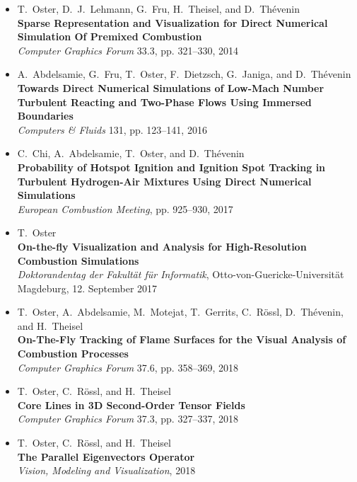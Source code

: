\documentclass[oneside]{scrartcl}
\begin{document}
\begin{itemize}[label={},leftmargin=0pt]
    \item T.~Oster, D.~J.~Lehmann, G.~Fru, H.~Theisel, and D.~Th\'evenin\\
        \textbf{Sparse Representation and Visualization for Direct Numerical
        Simulation Of Premixed Combustion}\\
        {\emph{Computer Graphics Forum} 33.3, pp. 321--330, 2014}

    \item A.~Abdelsamie, G.~Fru, T.~Oster, F.~Dietzsch, G.~Janiga,
        and D.~Thévenin\\
        \textbf{Towards Direct Numerical Simulations of Low-Mach Number
        Turbulent Reacting and Two-Phase Flows Using Immersed Boundaries}\\
        {\emph{Computers \& Fluids} 131, pp. 123--141, 2016}

    \item C.~Chi, A.~Abdelsamie, T.~Oster, and D.~Thévenin\\
        \textbf{Probability of Hotspot Ignition and Ignition Spot Tracking in
        Turbulent Hydrogen-Air Mixtures Using Direct Numerical Simulations}\\
        {\emph{ European Combustion Meeting}, pp. 925--930, 2017}

    \item T.~Oster\\
        \textbf{On-the-fly Visualization and Analysis for High-Resolution Combustion Simulations}\\
        \emph{Doktorandentag der Fakultät für Informatik}, Otto-von-Guericke-Universität Magdeburg, 12. September 2017

    \item T.~Oster, A.~Abdelsamie, M.~Motejat, T.~Gerrits, C.~R\"ossl,
        D.~Thévenin, and H.~Theisel\\
        \textbf{On-The-Fly Tracking of Flame Surfaces for the Visual Analysis
        of Combustion Processes}\\
        {\emph{Computer Graphics Forum} 37.6, pp. 358--369, 2018}

    \item T.~Oster, C.~R\"ossl, and H.~Theisel\\
        \textbf{Core Lines in 3D Second-Order Tensor Fields}\\
        {\emph{Computer Graphics Forum} 37.3, pp. 327--337, 2018}

    \item T.~Oster, C.~R\"ossl, and H.~Theisel\\
        \textbf{The Parallel Eigenvectors Operator}\\
        {\emph{Vision, Modeling and Visualization}, 2018}
\end{itemize}
%
\clearpage
%
%
%
\end{document}
